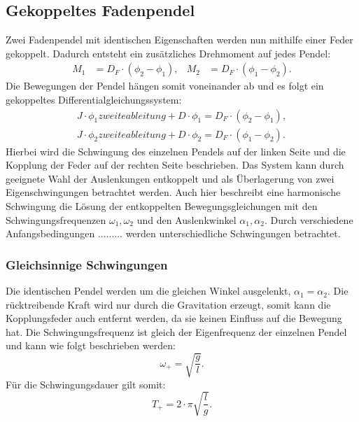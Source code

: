 \subsection{Gekoppeltes Fadenpendel}
Zwei Fadenpendel mit identischen Eigenschaften werden nun mithilfe einer Feder gekoppelt.
Dadurch entsteht ein zusätzliches Drehmoment auf jedes Pendel:
\begin{align*}
    M_1 &= D_F \cdot (\phi_2 -\phi_1),   &M_2 &= D_F \cdot (\phi_1 - \phi_2).
\end{align*}
Die Bewegungen der Pendel hängen somit voneinander ab und es folgt ein gekoppeltes Differentialgleichungssystem:
\begin{align*}
    J \cdot \phi_1 zweite ableitung + D \cdot \phi_1 = D_F \cdot (\phi_2 -\phi_1), \\
    J \cdot \phi_2 zweite ableitung + D \cdot \phi_2 = D_F \cdot (\phi_1 -\phi_2).   
\end{align*}
Hierbei wird die Schwingung des einzelnen Pendels auf der linken Seite und die Kopplung der Feder auf der rechten Seite beschrieben.
Das System kann durch geeignete Wahl der Auslenkungen entkoppelt und als Überlagerung von zwei Eigenschwingungen betrachtet werden.
Auch hier beschreibt eine harmonische Schwingung die Lösung der entkoppelten Bewegungsgleichungen mit den Schwingungsfrequenzen $\omega_1, \omega_2$
und den Auslenkwinkel $\alpha_1 , \alpha_2$.
Durch verschiedene Anfangsbedingungen ......... werden unterschiedliche Schwingungen betrachtet.

\subsubsection{Gleichsinnige Schwingungen}
Die identischen Pendel werden um die gleichen Winkel ausgelenkt, $\alpha_1 = \alpha_2$.
Die rücktreibende Kraft wird nur durch die Gravitation erzeugt, somit kann die Kopplungsfeder auch entfernt werden, da sie keinen Einfluss auf die Bewegung hat.
Die Schwingungsfrequenz ist gleich der Eigenfrequenz der einzelnen Pendel und kann wie folgt beschrieben werden:
\begin{equation*}
    \omega_+ = \sqrt{\frac{g}{l}}.
\end{equation*}
Für die Schwingungsdauer gilt somit:
\begin{equation*}
    T_+ = 2 \cdot \pi \sqrt{\frac{l}{g}}.
\end{equation*}

